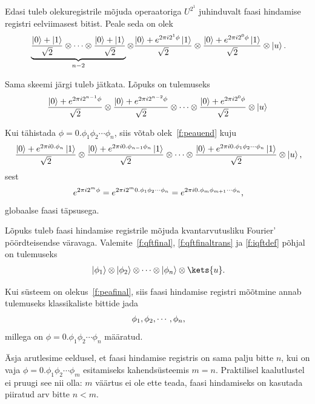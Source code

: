 \documentclass[12pt]{report}
\def\ket#1{\mathinner{|#1\rangle}}
\begin{document}
Edasi tuleb olekuregistrile mõjuda operaatoriga \(U^{2^1}\) juhinduvalt faasi hindamise registri eelviimasest bitist.
Peale seda on olek
\begin{align}
    \underbrace{\frac{\ket{0} + \ket{1}}{\sqrt{2}}
    \otimes \cdots
    \otimes \frac{\ket{0} + \ket{1}}{\sqrt{2}}
    }_{n-2}
    \otimes \frac{\ket{0} + e^{2\pi i2^1\phi} \ket{1}}{\sqrt{2}}
    \otimes \frac{\ket{0} + e^{2\pi i2^0\phi} \ket{1}}{\sqrt{2}}
    \otimes \ket{u} \rlap{.}
\end{align}

Sama skeemi järgi tuleb jätkata.
Lõpuks on tulemuseks
\begin{align}\label{f:peauend}
    \frac{\ket{0}+ e^{2\pi i2^{n-1}\phi}}{\sqrt{2}}
    \otimes \frac{\ket{0}+ e^{2\pi i2^{n-2}\phi}}{\sqrt{2}}
    \otimes\cdots
    \otimes \frac{\ket{0}+ e^{2\pi i2^0\phi}}{\sqrt{2}}
    \otimes\ket{u}
\end{align}

Kui tähistada \(\phi=0.\phi_1\phi_2\cdots\phi_n\), siis võtab olek~\ref{f:peauend} kuju
\begin{align}
    \frac{\ket{0}+ e^{2\pi i0.\phi_n}\ket{1}}{\sqrt{2}}
    \otimes \frac{\ket{0}+ e^{2\pi i0.\phi_{n-1}\phi_n}\ket{1}}{\sqrt{2}}
    \otimes\cdots
    \otimes \frac{\ket{0}+ e^{2\pi i0.\phi_1\phi_2\cdots\phi_n}\ket{1}}{\sqrt{2}}
    \otimes\ket{u} \rlap{,}
\end{align}
sest
\begin{align}
    e^{2\pi i2^m\phi}
    = e^{2\pi i2^m 0.\phi_1\phi_2\cdots\phi_n}
    = e^{2\pi i0.\phi_m\phi_{m+1}\cdots\phi_n} \rlap{,}
\end{align}
globaalse faasi täpsusega.

Lõpuks tuleb faasi hindamise registrile mõjuda kvantarvutusliku Fourier' pöördteisendse väravaga.
Valemite~\ref{f:qftfinal}, \ref{f:qftfinaltrans} ja \ref{f:iqftdef} põhjal on tulemuseks
\begin{align}\label{f:peafinal}
    \ket{\phi_1} \otimes \ket{\phi_2} \otimes \cdots \otimes \ket{\phi_n} \otimes \kets{u} \rlap{.}
\end{align}

Kui süsteem on olekus~\ref{f:peafinal}, siis faasi hindamise registri mõõtmine annab tulemuseks klassikaliste bittide jada
\begin{align}
    \phi_1, \phi_2, \cdots, \phi_n \rlap{,}
\end{align}
millega on \(\phi = 0.\phi_1\phi_2 \cdots \phi_n\) määratud.

Äsja arutlesime eeldusel, et faasi hindamise registris on sama palju bitte \(n\), kui on vaja \(\phi = 0.\phi_1\phi_2 \cdots \phi_m\) esitamiseks kahendsüsteemis \(m = n\).
Praktilisel kaalutlustel ei pruugi see nii olla: \(m\) väärtus ei ole ette teada, faasi hindamiseks on kasutada piiratud arv bitte \(n < m\).
\end{document}
